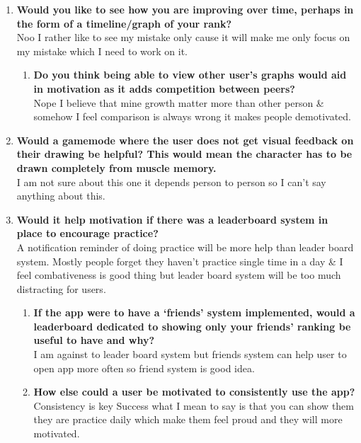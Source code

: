 \documentclass{article}
\begin{document}
\begin{enumerate}
\begin{enumerate}
        \item \textbf{Since they are not learning English, they will only understand French and their first language.} \\ then it should be in french
    \end{enumerate}
    \item \textbf{Would you like to see how you are improving over time, perhaps in the form of a timeline/graph of your rank?} \\ Noo I rather like to see my mistake only cause it will make me only focus on my mistake which I need to work on it.
    \begin{enumerate}
        \item \textbf{Do you think being able to view other user's graphs would aid in motivation as it adds competition between peers?} \\ Nope I believe that mine growth matter more than other person \& somehow I feel comparison is always wrong it makes people demotivated.
    \end{enumerate}
    \item \textbf{Would a gamemode where the user does not get visual feedback on their drawing be helpful? This would mean the character has to be drawn completely from muscle memory.} \\ I am not sure about this one it depends person to person so I can't say anything about this.
    \item \textbf{Would it help motivation if there was a leaderboard system in place to encourage practice?} \\ A notification reminder of doing practice will be more help than leader board system. Mostly people forget they haven't practice single time in a day \& I feel combativeness is good thing but leader board system will be too much distracting for users.
    \begin{enumerate}
        \item \textbf{If the app were to have a `friends' system implemented, would a leaderboard dedicated to showing only your friends' ranking be useful to have and why?} \\ I am against to leader board system but friends system can help user to open app more often so friend system is good idea.

        \item \textbf{How else could a user be motivated to consistently use the app?} \\ Consistency is key Success what I mean to say is that you can show them they are practice daily which make them feel proud and they will more motivated.
    \end{enumerate}
\end{enumerate}
\end{document}

